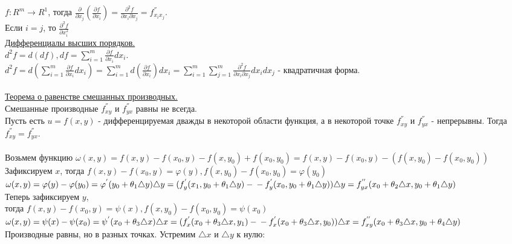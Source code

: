 \documentclass[12pt]{article}
\begin{document}
$f: R^m \to R^1$, тогда $\frac{\partial}{\partial x_j}(\frac{\partial f}{\partial x_i}) = \frac{\partial^2 f}{\partial x_i \partial x_j} = f_{x_i x_j}^{''}$.\\
Если $i = j$, то $\frac{\partial^2 f}{\partial x_i^2}$\\
\underline{Дифференциалы высших порядков.}\\
$d^2 f = d(df), df = \sum_{i=1}^m \frac{\partial f}{\partial x_i} dx_i$.\\
$d^2 f = d(\sum_{i=1}^m \frac{\partial f}{\partial x_i} dx_i) = \sum_{i=1}^m d(\frac{\partial f}{\partial x_i}) dx_i = \sum_{i=1}^m \sum_{j=1}^m \frac{\partial^2 f}{\partial x_i \partial x_j} dx_i dx_j$ - квадратичная форма.\\
\\
\label{question13_2}\underline{Теорема о равенстве смешанных производных.}\\
Смешанные производные $f_{xy}^{''}$ и $f_{yx}^{''}$ равны не всегда.\\
Пусть есть $u = f(x,y)$ - дифференцируемая дважды в некоторой области функция, а в некоторой точке $f_{xy}^{''}$ и $f_{yx}^{''}$ - непрерывны. Тогда $f_{xy}^{''}=f_{yx}^{''}$.\\
\\
Возьмем функцию $\omega(x,y) = f(x,y) - f(x_0, y) - f(x,y_0)+f(x_0, y_0) = f(x,y) - f(x_0, y) - (f(x,y_0)-f(x_0, y_0))$\\
Зафиксируем $x$, тогда $f(x,y) - f(x_0,y) = \varphi(y), f(x,y_0)-f(x_0,y_0)=\varphi(y_0)$\\
$\omega(x,y)=\varphi(y)-\varphi(y_0)=\varphi^{'}(y_0+\theta_1 {\bigtriangleup y}){\bigtriangleup y} = (f_y^{'}(x_1,y_0+\theta_1{\bigtriangleup y})-\\-f_y^{'}(x_0, y_0+\theta_1{\bigtriangleup y})){\bigtriangleup y} = f_{yx}^{''}(x_0+\theta_2 {\bigtriangleup x}, y_0+\theta_1 {\bigtriangleup y})$\\
Теперь зафиксируем $y$, \\
тогда $f(x,y) - f(x_0,y) = \psi(x), f(x,y_0)-f(x_0,y_0)=\psi(x_0)$\\
$\omega(x,y)=\psi(x)-\psi(x_0)=\psi^{'}(x_0+\theta_3 {\bigtriangleup x}){\bigtriangleup x} = (f_x^{'}(x_0+\theta_3{\bigtriangleup x},y_1)-\\-f_x^{'}(x_0+\theta_3{\bigtriangleup x},y_0)){\bigtriangleup x} = f_{xy}^{''}(x_0+\theta_3 {\bigtriangleup x}, y_0+\theta_4 {\bigtriangleup y})$\\
Производные равны, но в разных точках. Устремим ${\bigtriangleup x}$ и ${\bigtriangleup y}$ к нулю:\\
\end{document}

